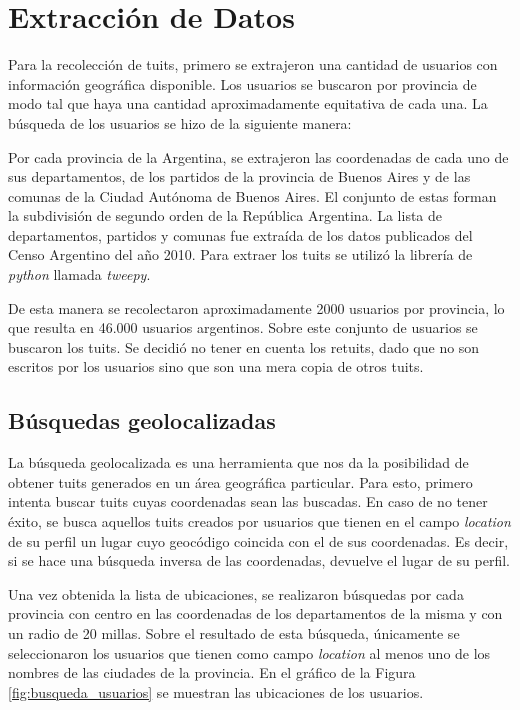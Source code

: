 

\section{Extracción de Datos}

Para la recolección de tuits, primero se extrajeron una cantidad de usuarios con información geográfica disponible.
Los usuarios se buscaron por provincia de modo tal que haya una cantidad aproximadamente equitativa de cada una.
La búsqueda de los usuarios se hizo de la siguiente manera:

Por cada provincia de la Argentina, se extrajeron las coordenadas de cada uno de sus departamentos, de los partidos de la provincia de Buenos Aires y de las comunas de la Ciudad Autónoma de Buenos Aires. El conjunto de estas forman la subdivisión de segundo orden de la República Argentina. La lista de departamentos, partidos y comunas fue extraída de los datos publicados del Censo Argentino del año 2010. Para extraer los tuits se utilizó la librería de \textit{python} llamada \textit{tweepy}.

De esta manera se recolectaron aproximadamente 2000 usuarios por provincia, lo que resulta en 46.000 usuarios argentinos. Sobre este conjunto de usuarios se buscaron los tuits. Se decidió no tener en cuenta los retuits, dado que no son escritos por los usuarios sino que son una mera copia de otros tuits. 


\subsection{Búsquedas geolocalizadas}

La búsqueda geolocalizada es una herramienta que nos da la posibilidad de obtener tuits generados en un área geográfica particular. Para esto, primero intenta buscar tuits cuyas coordenadas sean las buscadas. En caso de no tener éxito, se busca aquellos tuits creados por usuarios que tienen en el campo \textit{location} de su perfil un lugar cuyo geocódigo coincida con el de sus coordenadas. Es decir, si se hace una búsqueda inversa de las coordenadas, devuelve el lugar de su perfil.

Una vez obtenida la lista de ubicaciones, se realizaron búsquedas por cada provincia con centro en las coordenadas de los departamentos de la misma y con un radio de 20 millas. Sobre el resultado de esta búsqueda, únicamente se seleccionaron los usuarios que tienen como campo \textit{location} al menos uno de los nombres de las ciudades de la provincia. 
En el gráfico de la Figura \ref{fig:busqueda_usuarios} se muestran las ubicaciones de los usuarios.


